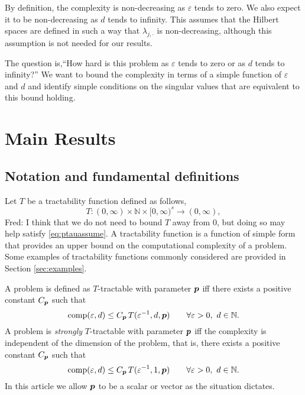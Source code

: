 \documentclass[11pt,a4paper]{article}
\newcommand{\fred}[1]{\begingroup\color{blue}Fred: #1\endgroup}
\begin{document}
By definition, the complexity is non-decreasing  as $\varepsilon$ tends to zero.  We also expect it to be non-decreasing as $d$ tends to infinity.  This assumes that the Hilbert spaces are defined in such a way that $\lambda_{j,\cdot}$ is non-decreasing, although this assumption is not needed for our results.

The question is,``How hard is this problem as $\varepsilon$ tends to zero or as $d$ tends to infinity?''  We want to bound the complexity in terms of a simple function of $\varepsilon$ and $d$ and identify simple conditions on the singular values that are equivalent to this bound holding.

\section{Main Results}

\subsection{Notation and fundamental definitions}
Let $T$ be a tractability function defined as follows,
\[
T :(0,\infty) \times \mathbb{N} \times [0,\infty)^s \rightarrow (0,\infty),
\]
\fred{I think that we do not need to bound $T$ away from $0$, but doing so may help satisfy \eqref{eq:ptauassume}.}
A tractability function is a function of simple form that provides an upper bound on the computational complexity of a problem.  Some examples of tractability functions commonly considered are provided in Section \ref{sec:examples}.


A problem is defined as $T$-tractable with parameter $\boldsymbol{p}$ iff there exists a positive constant $C_{\boldsymbol{p}}$ such that
\begin{equation} \label{eq:tract_def}
	\operatorname{comp}(\varepsilon,d) \le C_{\boldsymbol{p}}\, T(\varepsilon^{-1},d,\boldsymbol{p}) \qquad \forall \varepsilon >0, \ d \in \mathbb{N}.
\end{equation}
A problem is \emph{strongly}
$T$-tractable with parameter $\boldsymbol{p}$ iff the complexity is independent of the dimension of the problem, that is, there exists a positive constant $C_{\boldsymbol{p}}$ such that
\begin{equation} \label{eq:strong_tract_def}
	\operatorname{comp}(\varepsilon,d) \le C_{\boldsymbol{p}}\, T(\varepsilon^{-1},1,\boldsymbol{p}) \qquad \forall \varepsilon >0 , \ d \in \mathbb{N}.
\end{equation}
In this article we allow $\boldsymbol{p}$ to be a scalar or vector as the situation dictates.
\end{document}
